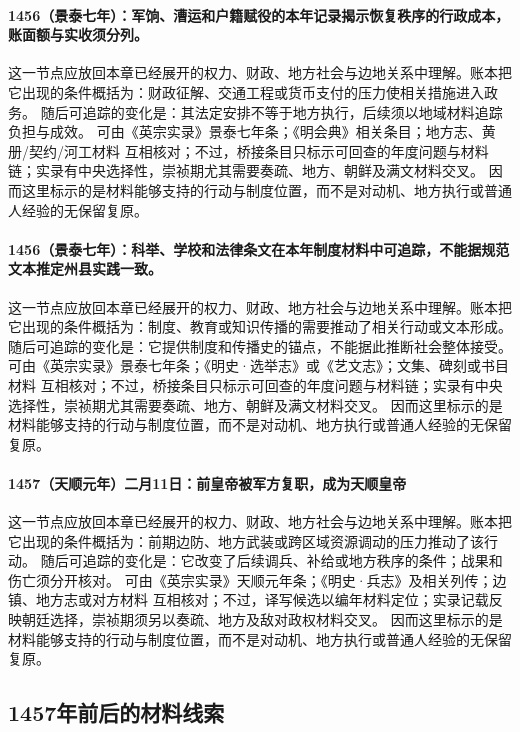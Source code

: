 \paragraph{1456（景泰七年）：军饷、漕运和户籍赋役的本年记录揭示恢复秩序的行政成本，账面额与实收须分列。} 这一节点应放回本章已经展开的权力、财政、地方社会与边地关系中理解。账本把它出现的条件概括为：财政征解、交通工程或货币支付的压力使相关措施进入政务。 随后可追踪的变化是：其法定安排不等于地方执行，后续须以地域材料追踪负担与成效。 可由《英宗实录》景泰七年条；《明会典》相关条目；地方志、黄册/契约/河工材料 互相核对；不过，桥接条目只标示可回查的年度问题与材料链；实录有中央选择性，崇祯期尤其需要奏疏、地方、朝鲜及满文材料交叉。 因而这里标示的是材料能够支持的行动与制度位置，而不是对动机、地方执行或普通人经验的无保留复原。

\paragraph{1456（景泰七年）：科举、学校和法律条文在本年制度材料中可追踪，不能据规范文本推定州县实践一致。} 这一节点应放回本章已经展开的权力、财政、地方社会与边地关系中理解。账本把它出现的条件概括为：制度、教育或知识传播的需要推动了相关行动或文本形成。 随后可追踪的变化是：它提供制度和传播史的锚点，不能据此推断社会整体接受。 可由《英宗实录》景泰七年条；《明史·选举志》或《艺文志》；文集、碑刻或书目材料 互相核对；不过，桥接条目只标示可回查的年度问题与材料链；实录有中央选择性，崇祯期尤其需要奏疏、地方、朝鲜及满文材料交叉。 因而这里标示的是材料能够支持的行动与制度位置，而不是对动机、地方执行或普通人经验的无保留复原。

\paragraph{1457（天顺元年）二月11日：前皇帝被军方复职，成为天顺皇帝} 这一节点应放回本章已经展开的权力、财政、地方社会与边地关系中理解。账本把它出现的条件概括为：前期边防、地方武装或跨区域资源调动的压力推动了该行动。 随后可追踪的变化是：它改变了后续调兵、补给或地方秩序的条件；战果和伤亡须分开核对。 可由《英宗实录》天顺元年条；《明史·兵志》及相关列传；边镇、地方志或对方材料 互相核对；不过，译写候选以编年材料定位；实录记载反映朝廷选择，崇祯期须另以奏疏、地方及敌对政权材料交叉。 因而这里标示的是材料能够支持的行动与制度位置，而不是对动机、地方执行或普通人经验的无保留复原。

\subsection{1457年前后的材料线索}

